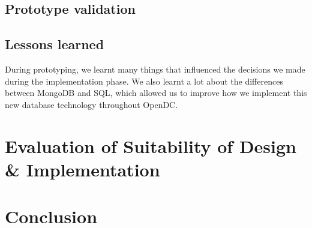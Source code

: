 \documentclass[11pt]{article}
\begin{document}
	\subsection{Prototype validation}

	\subsection{Lessons learned}
		During prototyping, we learnt many things that influenced the decisions we made during the implementation phase.
		We also learnt a lot about the differences between MongoDB and SQL, which allowed us to improve how we implement this new database technology throughout OpenDC.

\section{Evaluation of Suitability of Design \& Implementation}


\section{Conclusion} \label{sec:conclusion}



\end{document}
